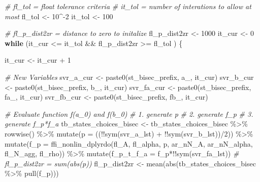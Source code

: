 \documentclass[
]{book}
\newenvironment{Shaded}{\begin{snugshade}}{\end{snugshade}}
\newcommand{\AttributeTok}[1]{\textcolor[rgb]{0.77,0.63,0.00}{#1}}
\newcommand{\CommentTok}[1]{\textcolor[rgb]{0.56,0.35,0.01}{\textit{#1}}}
\newcommand{\ControlFlowTok}[1]{\textcolor[rgb]{0.13,0.29,0.53}{\textbf{#1}}}
\newcommand{\DecValTok}[1]{\textcolor[rgb]{0.00,0.00,0.81}{#1}}
\newcommand{\FunctionTok}[1]{\textcolor[rgb]{0.00,0.00,0.00}{#1}}
\newcommand{\NormalTok}[1]{#1}
\newcommand{\OtherTok}[1]{\textcolor[rgb]{0.56,0.35,0.01}{#1}}
\newcommand{\SpecialCharTok}[1]{\textcolor[rgb]{0.00,0.00,0.00}{#1}}
\newcommand{\StringTok}[1]{\textcolor[rgb]{0.31,0.60,0.02}{#1}}
\begin{document}
\begin{Shaded}
\begin{Highlighting}[]
\CommentTok{\# fl\_tol = float tolerance criteria}
\CommentTok{\# it\_tol = number of interations to allow at most}
\NormalTok{fl\_tol }\OtherTok{\textless{}{-}} \DecValTok{10}\SpecialCharTok{\^{}{-}}\DecValTok{2}
\NormalTok{it\_tol }\OtherTok{\textless{}{-}} \DecValTok{100}

\CommentTok{\# fl\_p\_dist2zr = distance to zero to initalize}
\NormalTok{fl\_p\_dist2zr }\OtherTok{\textless{}{-}} \DecValTok{1000}
\NormalTok{it\_cur }\OtherTok{\textless{}{-}} \DecValTok{0}
\ControlFlowTok{while}\NormalTok{ (it\_cur }\SpecialCharTok{\textless{}=}\NormalTok{ it\_tol }\SpecialCharTok{\&\&}\NormalTok{ fl\_p\_dist2zr }\SpecialCharTok{\textgreater{}=}\NormalTok{ fl\_tol ) \{}

\NormalTok{  it\_cur }\OtherTok{\textless{}{-}}\NormalTok{ it\_cur }\SpecialCharTok{+} \DecValTok{1}

  \CommentTok{\# New Variables}
\NormalTok{  svr\_a\_cur }\OtherTok{\textless{}{-}} \FunctionTok{paste0}\NormalTok{(st\_bisec\_prefix, }\StringTok{\textquotesingle{}a\_\textquotesingle{}}\NormalTok{, it\_cur)}
\NormalTok{  svr\_b\_cur }\OtherTok{\textless{}{-}} \FunctionTok{paste0}\NormalTok{(st\_bisec\_prefix, }\StringTok{\textquotesingle{}b\_\textquotesingle{}}\NormalTok{, it\_cur)}
\NormalTok{  svr\_fa\_cur }\OtherTok{\textless{}{-}} \FunctionTok{paste0}\NormalTok{(st\_bisec\_prefix, }\StringTok{\textquotesingle{}fa\_\textquotesingle{}}\NormalTok{, it\_cur)}
\NormalTok{  svr\_fb\_cur }\OtherTok{\textless{}{-}} \FunctionTok{paste0}\NormalTok{(st\_bisec\_prefix, }\StringTok{\textquotesingle{}fb\_\textquotesingle{}}\NormalTok{, it\_cur)}

  \CommentTok{\# Evaluate function f(a\_0) and f(b\_0)}
  \CommentTok{\# 1. generate p}
  \CommentTok{\# 2. generate f\_p}
  \CommentTok{\# 3. generate f\_p*f\_a}
\NormalTok{  tb\_states\_choices\_bisec }\OtherTok{\textless{}{-}}\NormalTok{ tb\_states\_choices\_bisec }\SpecialCharTok{\%\textgreater{}\%}
    \FunctionTok{rowwise}\NormalTok{() }\SpecialCharTok{\%\textgreater{}\%}
    \FunctionTok{mutate}\NormalTok{(}\AttributeTok{p =}\NormalTok{ ((}\SpecialCharTok{!!}\FunctionTok{sym}\NormalTok{(svr\_a\_lst) }\SpecialCharTok{+} \SpecialCharTok{!!}\FunctionTok{sym}\NormalTok{(svr\_b\_lst))}\SpecialCharTok{/}\DecValTok{2}\NormalTok{)) }\SpecialCharTok{\%\textgreater{}\%}
    \FunctionTok{mutate}\NormalTok{(}\AttributeTok{f\_p =} \FunctionTok{ffi\_nonlin\_dplyrdo}\NormalTok{(fl\_A, fl\_alpha, p,}
\NormalTok{                                    ar\_nN\_A, ar\_nN\_alpha,}
\NormalTok{                                    fl\_N\_agg, fl\_rho)) }\SpecialCharTok{\%\textgreater{}\%}
    \FunctionTok{mutate}\NormalTok{(}\AttributeTok{f\_p\_t\_f\_a =}\NormalTok{ f\_p}\SpecialCharTok{*!!}\FunctionTok{sym}\NormalTok{(svr\_fa\_lst))}
  \CommentTok{\# fl\_p\_dist2zr = sum(abs(p))}
\NormalTok{  fl\_p\_dist2zr }\OtherTok{\textless{}{-}} \FunctionTok{mean}\NormalTok{(}\FunctionTok{abs}\NormalTok{(tb\_states\_choices\_bisec }\SpecialCharTok{\%\textgreater{}\%} \FunctionTok{pull}\NormalTok{(f\_p)))}


\end{Highlighting}
\end{Shaded}
\end{document}
